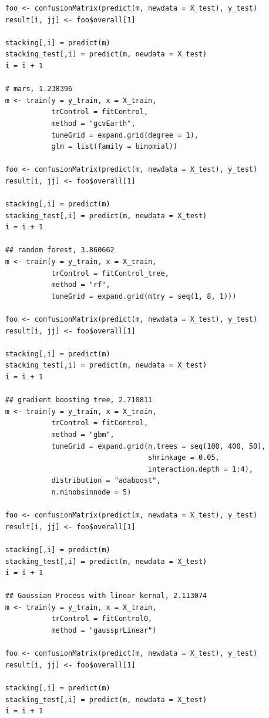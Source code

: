 \documentclass[11pt,oneside,a4paper]{article}
\begin{document}
\begin{verbatim}
    foo <- confusionMatrix(predict(m, newdata = X_test), y_test)
    result[i, jj] <- foo$overall[1]
    
    stacking[,i] = predict(m)
    stacking_test[,i] = predict(m, newdata = X_test)
    i = i + 1
    
    # mars, 1.238396
    m <- train(y = y_train, x = X_train,
               trControl = fitControl,
               method = "gcvEarth", 
               tuneGrid = expand.grid(degree = 1), 
               glm = list(family = binomial))

    foo <- confusionMatrix(predict(m, newdata = X_test), y_test)
    result[i, jj] <- foo$overall[1]
    
    stacking[,i] = predict(m)
    stacking_test[,i] = predict(m, newdata = X_test)
    i = i + 1
    
    ## random forest, 3.860662
    m <- train(y = y_train, x = X_train,
               trControl = fitControl_tree,
               method = "rf", 
               tuneGrid = expand.grid(mtry = seq(1, 8, 1)))

    foo <- confusionMatrix(predict(m, newdata = X_test), y_test)
    result[i, jj] <- foo$overall[1]
    
    stacking[,i] = predict(m)
    stacking_test[,i] = predict(m, newdata = X_test)
    i = i + 1
    
    ## gradient boosting tree, 2.710811
    m <- train(y = y_train, x = X_train,
               trControl = fitControl,
               method = "gbm", 
               tuneGrid = expand.grid(n.trees = seq(100, 400, 50), 
                                      shrinkage = 0.05, 
                                      interaction.depth = 1:4), 
               distribution = "adaboost", 
               n.minobsinnode = 5)
    
    foo <- confusionMatrix(predict(m, newdata = X_test), y_test)
    result[i, jj] <- foo$overall[1]
    
    stacking[,i] = predict(m)
    stacking_test[,i] = predict(m, newdata = X_test)
    i = i + 1
    
    ## Gaussian Process with linear kernal, 2.113074
    m <- train(y = y_train, x = X_train,
               trControl = fitControl0,
               method = "gaussprLinear")

    foo <- confusionMatrix(predict(m, newdata = X_test), y_test)
    result[i, jj] <- foo$overall[1]
    
    stacking[,i] = predict(m)
    stacking_test[,i] = predict(m, newdata = X_test)
    i = i + 1
    

\end{verbatim}
\end{document}
